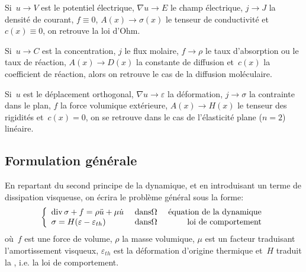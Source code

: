 \medskip
Si~$u\longrightarrow V$ est le potentiel électrique, $\nabla u\longrightarrow E$ le champ
électrique, $j\longrightarrow J$ la densité de courant, $f\equiv 0$, $A(x)
\longrightarrow\sigma(x)$ le tenseur de conductivité et~$c(x)\equiv 0$, on
retrouve la loi d'Ohm.

\medskip
Si~$u\longrightarrow C$ est la concentration, $j$ le flux molaire,
$f\longrightarrow\rho$ le taux d'absorption ou le taux de réaction, $A(x)\longrightarrow
D(x)$ la constante de diffusion et~$c(x)$ la coefficient de réaction, alors on retrouve 
le cas de la diffusion moléculaire.

\medskip
Si~$u$ est le déplacement orthogonal, $\nabla u\longrightarrow\varepsilon$
la déformation, $j\longrightarrow\sigma$ la contrainte dans le plan, $f$
la force volumique extérieure, $A(x)\longrightarrow H(x)$ le tenseur des
rigidités et~$c(x)=0$, on se retrouve dans le cas de l'élasticité plane ($n=2$)
linéaire.

\medskip
\subsection{Formulation générale}

En repartant du second principe de la dynamique, et en introduisant un terme
de dissipation visqueuse, on écrira le problème général sous la forme:
\begin{equation}
\left\{
\begin{array}{llr}
\operatorname{div}\sigma + f = \rho \ddot{u} + \mu \dot{u} & \text{ dans} \Omega & \text{ équation de la dynamique}\\
\sigma=H(\varepsilon-\varepsilon_{th}) & \text{ dans} \Omega & \text{ loi de comportement}\\
\end{array}
\right.
\end{equation}
où~$f$ est une force de volume, $\rho$ la masse volumique, $\mu$ est un facteur
traduisant l'amortissement visqueux, $\varepsilon_{th}$ est la déformation d'origine
thermique et~$H$ traduit la ,
i.e. la loi de comportement.


